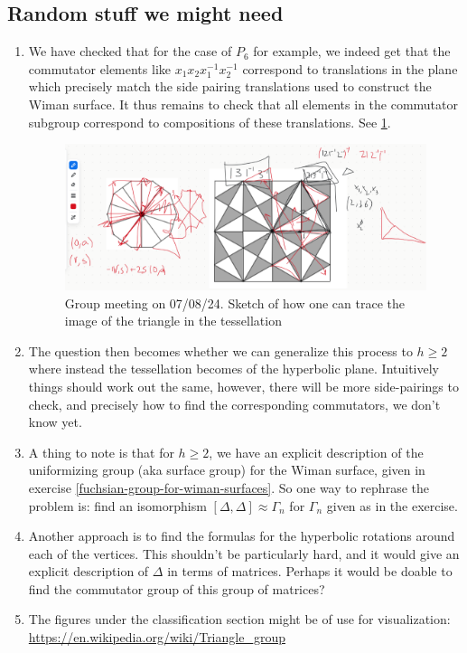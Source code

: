 \documentclass[reqno]{amsart}
\theoremstyle{definition}
\theoremstyle{remark}
\begin{document}
\subsection{Random stuff we might need}
\begin{enumerate}
        \item We have checked that for the case of $P_6$ for example,
        we indeed get that the commutator elements like $x_1 x_2 x_1^{-1}
        x_2^{-1}$ correspond to translations in the plane which precisely
        match the side pairing translations used to construct the Wiman surface.
        It thus remains to check that all elements in the commutator
        subgroup correspond to compositions of these translations. 
        See \ref{fig:P_6-commutators}.
        \begin{figure}[http]
            \centering
            \includegraphics[width=1.2\linewidth]{P_6-commutators.png}
            \caption{Group meeting on 07/08/24. Sketch of how one can trace the image of the triangle
            in the tessellation}
            \label{fig:P_6-commutators}
        \end{figure}
        \item The question then becomes whether we can generalize this process
        to $h \geq 2$ where instead the tessellation becomes of the hyperbolic
        plane. Intuitively things should work out the same, however, there
        will be more side-pairings to check, and precisely how to find the
        corresponding commutators, we don't know yet. 
        \item A thing to note is that for $h \geq 2$, we have an explicit
        description of the uniformizing group (aka surface group) for
        the Wiman surface, given in exercise 
        \ref{fuchsian-group-for-wiman-surfaces}. So one way to rephrase the
        problem is: find an isomorphism $\left[\Delta, \Delta \right] 
        \approx \Gamma_n$ for $\Gamma_n$ given as in the exercise. 
        \item Another approach is to find the formulas for the hyperbolic
        rotations around each of the vertices. This shouldn't be particularly
        hard, and it would give an explicit description of $\Delta$ in
        terms of matrices. Perhaps it would be doable to find the commutator
        group of this group of matrices?
        \item The figures under the classification section might be of use for visualization: 
        \url{https://en.wikipedia.org/wiki/Triangle_group}
    \end{enumerate}
\end{document}
